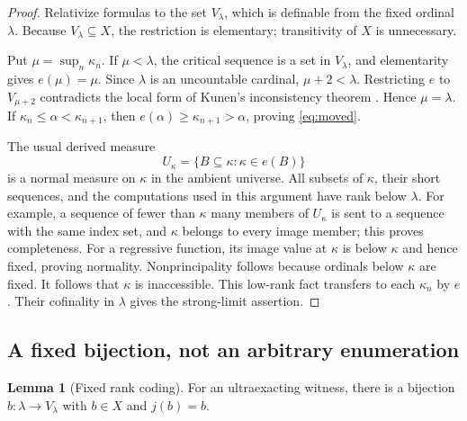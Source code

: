 \documentclass[11pt,letterpaper]{article}
\theoremstyle{definition}
\newtheorem{lemma}[definition]{Lemma}
\numberwithin{equation}{section}
\begin{document}
\begin{proof}
Relativize formulas to the set $V_\lambda$, which is definable from the fixed ordinal $\lambda$. Because $V_\lambda\subseteq X$, the restriction is elementary; transitivity of $X$ is unnecessary.

Put $\mu=\sup_n\kappa_n$. If $\mu<\lambda$, the critical sequence is a set in $V_\lambda$, and elementarity gives $e(\mu)=\mu$. Since $\lambda$ is an uncountable cardinal, $\mu+2<\lambda$. Restricting $e$ to $V_{\mu+2}$ contradicts the local form of Kunen's inconsistency theorem \cite{kunen,hkp}. Hence $\mu=\lambda$. If $\kappa_n\le\alpha<\kappa_{n+1}$, then
$e(\alpha)\ge\kappa_{n+1}>\alpha$, proving \eqref{eq:moved}.

The usual derived measure
\[
 U_\kappa=\{B\subseteq\kappa:\kappa\in e(B)\}
\]
is a normal measure on $\kappa$ in the ambient universe. All subsets of $\kappa$, their short sequences, and the computations used in this argument have rank below $\lambda$. For example, a sequence of fewer than $\kappa$ many members of $U_\kappa$ is sent to a sequence with the same index set, and $\kappa$ belongs to every image member; this proves completeness. For a regressive function, its image value at $\kappa$ is below $\kappa$ and hence fixed, proving normality. Nonprincipality follows because ordinals below $\kappa$ are fixed. It follows that $\kappa$ is inaccessible. This low-rank fact transfers to each $\kappa_n$ by $e$. Their cofinality in $\lambda$ gives the strong-limit assertion.
\end{proof}

\subsection{A fixed bijection, not an arbitrary enumeration}

\begin{lemma}[Fixed rank coding]\label{lem:b}
For an ultraexacting witness, there is a bijection $b:\lambda\to V_\lambda$ with $b\in X$ and $j(b)=b$.
\end{lemma}
\end{document}

